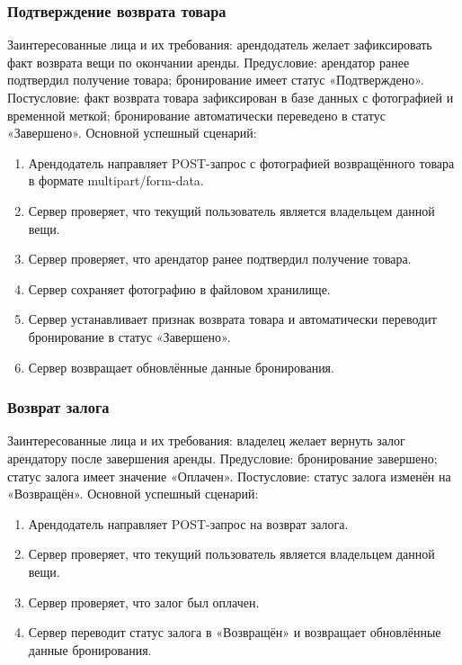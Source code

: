 \subsubsection{Подтверждение возврата товара}
Заинтересованные лица и их требования: арендодатель желает зафиксировать факт возврата вещи по окончании аренды.
Предусловие: арендатор ранее подтвердил получение товара; бронирование имеет статус «Подтверждено».
Постусловие: факт возврата товара зафиксирован в базе данных с фотографией и временной меткой; бронирование автоматически переведено в статус «Завершено».
Основной успешный сценарий:
\begin{enumerate}
\item Арендодатель направляет POST-запрос с фотографией возвращённого товара в формате multipart/form-data.
\item Сервер проверяет, что текущий пользователь является владельцем данной вещи.
\item Сервер проверяет, что арендатор ранее подтвердил получение товара.
\item Сервер сохраняет фотографию в файловом хранилище.
\item Сервер устанавливает признак возврата товара и автоматически переводит бронирование в статус «Завершено».
\item Сервер возвращает обновлённые данные бронирования.
\end{enumerate}

\subsubsection{Возврат залога}
Заинтересованные лица и их требования: владелец желает вернуть залог арендатору после завершения аренды.
Предусловие: бронирование завершено; статус залога имеет значение «Оплачен».
Постусловие: статус залога изменён на «Возвращён».
Основной успешный сценарий:
\begin{enumerate}
\item Арендодатель направляет POST-запрос на возврат залога.
\item Сервер проверяет, что текущий пользователь является владельцем данной вещи.
\item Сервер проверяет, что залог был оплачен.
\item Сервер переводит статус залога в «Возвращён» и возвращает обновлённые данные бронирования.
\end{enumerate}

